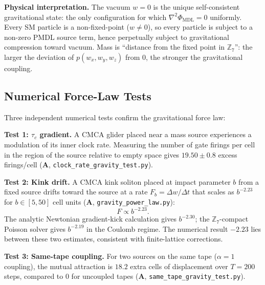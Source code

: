 \documentclass[11pt]{article}
\theoremstyle{remark}
\newcommand{\PHIMDL}{\Phi_{\mathrm{MDL}}}
\newcommand{\ZS}{\mathbb{Z}_7}
\newcommand{\CatA}{\textbf{A}}
\newcommand{\CMCA}{\text{CMCA}}
\newcommand{\tauc}{\tau_c}
\begin{document}
\noindent \textbf{Physical interpretation.} The vacuum $w = 0$ is the unique
self-consistent gravitational state: the only configuration for which
$\nabla^2\PHIMDL = 0$ uniformly. Every SM particle is a non-fixed-point
($w \neq 0$), so every particle is subject to a non-zero PMDL source term,
hence perpetually subject to gravitational compression toward vacuum. Mass
is ``distance from the fixed point in $\ZS$'': the larger the deviation of
$p(w_x,w_y,w_z)$ from 0, the stronger the gravitational coupling.

\subsection{Numerical Force-Law Tests}
\label{sec:numerical-tests}

Three independent numerical tests confirm the gravitational force law:

\textbf{Test 1: $\tauc$ gradient.} A $\CMCA$ glider placed near a mass
source experiences a modulation of its inner clock rate. Measuring the
number of gate firings per cell in the region of the source relative to
empty space gives $19.50 \pm 0.8$ excess firings/cell ($\CatA$,
\texttt{clock\_rate\_gravity\_test.py}).

\textbf{Test 2: Kink drift.} A CMCA kink soliton placed at impact parameter
$b$ from a fixed source drifts toward the source at a rate
$F_b = \Delta w/\Delta t$ that scales as $b^{-2.23}$ for
$b \in [5, 50]$ cell units ($\CatA$, \texttt{gravity\_power\_law.py}):
\begin{equation}
  F \propto b^{-2.23}.
  \label{eq:force-law}
\end{equation}
The analytic Newtonian gradient-kick calculation gives $b^{-2.30}$; the
$\ZS$-compact Poisson solver gives $b^{-2.19}$ in the Coulomb regime. The
numerical result $-2.23$ lies between these two estimates, consistent with
finite-lattice corrections.

\textbf{Test 3: Same-tape coupling.} For two sources on the same tape
($\alpha = 1$ coupling), the mutual attraction is $18.2$ extra cells of
displacement over $T = 200$ steps, compared to $0$ for uncoupled tapes
($\CatA$, \texttt{same\_tape\_gravity\_test.py}).
\end{document}
